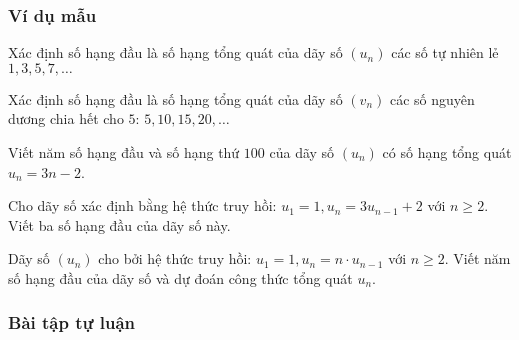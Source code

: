 \subsubsection{Ví dụ mẫu}
\begin{vd}[NB]%
	Xác định số hạng đầu là số hạng tổng quát của dãy số $(u_n)$ các số tự nhiên lẻ $1, 3, 5, 7, \ldots $
\end{vd}
\begin{vd}[NB]%
	Xác định số hạng đầu là số hạng tổng quát của dãy số $(v_n)$ các số nguyên dương chia hết cho $5$: $5,10,15,20,\ldots$
\end{vd}
\begin{vd}[NB]%
	Viết năm số hạng đầu và số hạng thứ $100$ của dãy số $(u_n)$ có số hạng tổng quát $u_n=3n-2$.
\end{vd}
\begin{vd}[NB]%
	Cho dãy số xác định bằng hệ thức truy hồi: $u_1=1, u_n=3u_{n-1}+2$ với $n\ge 2$. Viết ba số hạng đầu của dãy số này.
\end{vd}
\begin{vd}[NB]%
	Dãy số $(u_n)$ cho bởi hệ thức truy hồi: $u_1=1, u_n=n \cdot u_{n-1}$ với $n \ge 2$. Viết năm số hạng đầu của dãy số và dự đoán công thức tổng quát $u_n$.
\end{vd}
\subsubsection{Bài tập tự luận}
 

